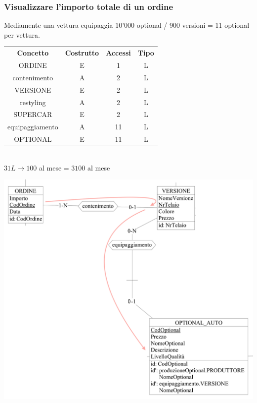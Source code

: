 \documentclass[11pt]{article}
\begin{document}
\subsubsection{Visualizzare l'importo totale di un ordine} 

Mediamente una vettura equipaggia 10'000 optional / 900 versioni = 11 optional per vettura.

\begin{table}[H]
    \centering
    \begin{tabular}{c c c c}
        \rowcolor{red!20!}
        \textbf{Concetto} & \textbf{Costrutto} & \textbf{Accessi} &
        \textbf{Tipo}\\
        ORDINE & E & 1 & L \\
        contenimento & A & 2 & L \\
        VERSIONE & E & 2 & L \\
        restyling & A & 2 & L \\
        SUPERCAR & E & 2 & L \\
        equipaggiamento & A & 11 & L \\
        OPTIONAL & E & 11 & L \\
    \end{tabular}\\
    \( 31L \rightarrow 100 \) al mese = \( 3100 \) al mese
\end{table}

\begin{center}
    \includegraphics[width=\linewidth]{images/navigationSchemes/calcolaOrdine.png}
\end{center}
\end{document}
